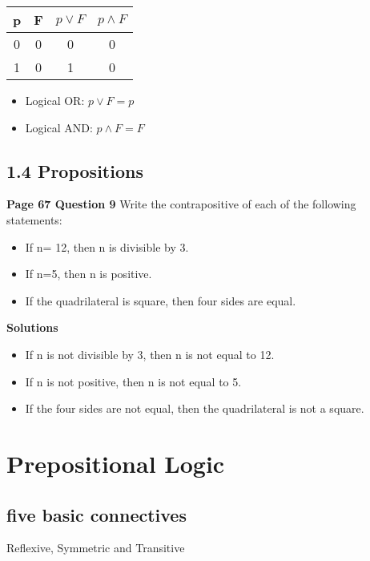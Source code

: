 \documentclass[]{report}
\begin{document}
\begin{center}
{
\begin{tabular}{|c|c||c|c|}
\hline  p & F & $p \vee F$ & $ p \wedge F$ \\ \hline
\hline  0 & 0 & 0 & 0 \\ 
\hline  1 &  0 & 1 & 0 \\ 
\hline 
\end{tabular} 
}
\end{center}
\begin{itemize}
\item Logical OR:  $p \vee F = p $
\item Logical AND: $p \wedge F = F $
\end{itemize}
\subsection*{1.4 Propositions}
\textbf{Page 67 Question 9}
Write the contrapositive of each of the following statements:

\begin{itemize}
\item If n= 12, then n is divisible by 3.
\item If n=5, then n is positive.
\item If the quadrilateral is square, then four sides are equal.
\end{itemize}

\textbf{Solutions}
\begin{itemize}
\item If n is not divisible by 3, then n is not equal to 12.
\item If n is not positive, then n is not equal to 5.
\item If the four sides are not equal, then the quadrilateral is not a square.
\end{itemize}

\section*{Prepositional Logic}

\subsection{five basic connectives}


Reflexive, Symmetric and Transitive
\end{document}
